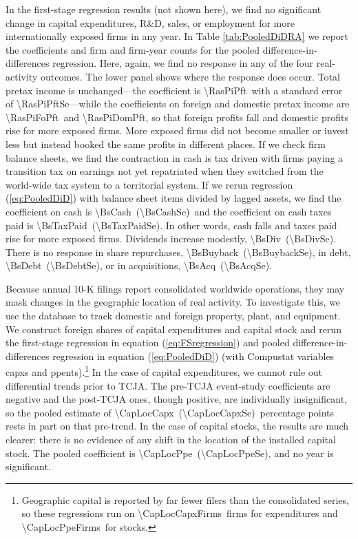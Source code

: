 \documentclass[11pt,letterpaper]{article}
\newcommand{\CountNum}[1]{\num[round-mode=places,round-precision=0]{#1}}
\newcommand{\CoefNum}[1]{\num[round-mode=places,round-precision=3]{#1}}
\newcommand{\SENum}[1]{(\num[round-mode=places,round-precision=3]{#1})}
\begin{document}
In the first-stage regression results (not shown here),
we find no significant change in capital expenditures, R\&D,
sales, or employment for more internationally exposed firms in any year.
In Table \ref{tab:PooledDiDRA} we report the coefficients and
firm and firm-year counts for the pooled difference-in-differences
regression. Here, again, we find no response in any of the four real-activity outcomes.
The lower panel shows where the response does occur. Total pretax
income is unchanged---the coefficient is
\CoefNum{\RasPiPft}\ with a standard error of
\CoefNum{\RasPiPftSe}---while the coefficients on foreign and
domestic pretax income are \CoefNum{\RasPiFoPft}\ and
\CoefNum{\RasPiDomPft}, so that foreign profits fall and domestic
profits rise for more exposed firms. More
exposed firms did not become smaller or invest less but instead booked the
same profits in different places.
If we check firm balance sheets, we find the contraction in cash
is tax driven with firms paying a transition tax on earnings not yet 
repatriated when they switched from the world-wide tax system
to a territorial system.  
If we rerun regression (\ref{eq:PooledDiD}) with balance sheet
items divided by lagged assets, we find 
the coefficient on cash is
\CoefNum{\BsCash}\ \SENum{\BsCashSe}\ and the coefficient on cash
taxes paid is \CoefNum{\BsTaxPaid}\ \SENum{\BsTaxPaidSe}. In other words, cash falls
and taxes paid rise for more exposed firms. Dividends increase modestly,
\CoefNum{\BsDiv}\ \SENum{\BsDivSe}. There is no response in share
repurchases, \CoefNum{\BsBuyback}\ \SENum{\BsBuybackSe}, in debt,
\CoefNum{\BsDebt}\ \SENum{\BsDebtSe}, or in acquisitions,
\CoefNum{\BsAcq}\ \SENum{\BsAcqSe}.

Because annual 10-K filings report consolidated worldwide operations, 
they may mask changes in the geographic location of real activity.
To investigate this, we use the \citet{CompustatSegments}
database to track domestic and foreign property, plant, and equipment.  
We construct foreign shares of capital expenditures  and capital stock 
and rerun the first-stage regression in equation (\ref{eq:FSregression})
and pooled difference-in-differences regression in equation (\ref{eq:PooledDiD})
(with Compustat variables capxs and ppents).\footnote{%
Geographic capital is reported by far fewer filers than the
consolidated series, so these regressions run on
\CountNum{\CapLocCapxFirms}\ firms for expenditures and
\CountNum{\CapLocPpeFirms}\ for stocks.}
In the case of capital
expenditures, we cannot rule out differential trends prior to TCJA. The
pre-TCJA event-study coefficients are negative and the post-TCJA ones,
though positive, are individually insignificant, so the pooled estimate
of \CoefNum{\CapLocCapx}\ \SENum{\CapLocCapxSe}\ percentage
points rests in part on that pre-trend.
In the case of capital stocks, the results are much clearer: there
is no evidence of any shift in the location of the installed capital
stock. The pooled coefficient is \CoefNum{\CapLocPpe}\
\SENum{\CapLocPpeSe}, and no year is significant.
\end{document}
